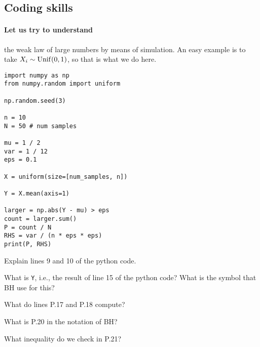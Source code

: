 \documentclass[assignments]{subfiles}
\begin{document}
\subsection{Coding skills}

\paragraph{Let us try to understand} the weak law of large numbers by means of simulation. An easy example is to take $X_{i}\sim\mathrm{Unif}(0,1)$, so that is what we do here.

\begin{verbatim}
import numpy as np
from numpy.random import uniform

np.random.seed(3)

n = 10
N = 50 # num samples

mu = 1 / 2
var = 1 / 12
eps = 0.1

X = uniform(size=[num_samples, n])

Y = X.mean(axis=1)

larger = np.abs(Y - mu) > eps
count = larger.sum()
P = count / N
RHS = var / (n * eps * eps)
print(P, RHS)
\end{verbatim}

\begin{exercise}
Explain lines 9 and 10 of the python code.
\begin{solution}
\end{solution}
\end{exercise}

\begin{exercise}
What is \texttt{Y}, i.e., the result of line 15 of the python code? What is the symbol that BH use for this?
\begin{solution}
\end{solution}
\end{exercise}

\begin{exercise}
What do lines P.17 and P.18 compute?
\begin{solution}
\end{solution}
\end{exercise}

\begin{exercise}
What is P.20 in the notation of BH?
\begin{solution}
\end{solution}
\end{exercise}

\begin{exercise}
What inequality do we check in P.21?
\begin{solution}
\end{solution}
\end{exercise}
\end{document}
